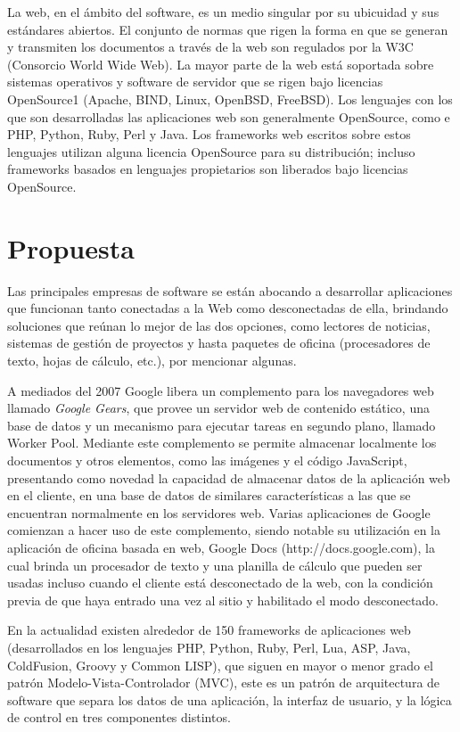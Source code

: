 \documentclass[a4paper]{report}
\begin{document}
    
La web, en el ámbito del software, es un medio singular por su ubicuidad y 
sus estándares abiertos. El conjunto de normas que rigen la forma en 
que se generan y transmiten los documentos a través de la web son 
regulados por la W3C (Consorcio World Wide Web). La mayor parte de la web está 
soportada sobre sistemas operativos y software de servidor que se rigen bajo 
licencias OpenSource1 (Apache, BIND, Linux, OpenBSD, FreeBSD). Los lenguajes 
con los que son desarrolladas las aplicaciones web son generalmente OpenSource, 
como e PHP, Python, Ruby, Perl y Java. Los frameworks web escritos sobre estos 
lenguajes utilizan alguna licencia OpenSource para su distribución; incluso 
frameworks basados en lenguajes propietarios son liberados bajo licencias OpenSource.


\chapter{Propuesta}
\label{ch:propuesta}
Las principales empresas de software se están abocando a desarrollar aplicaciones 
que funcionan tanto conectadas a la Web como desconectadas de ella, brindando 
soluciones que reúnan lo mejor de las dos opciones, como lectores de noticias, 
sistemas de gestión de proyectos y hasta paquetes de oficina (procesadores de 
texto, hojas de cálculo, etc.), por mencionar algunas.

A mediados del 2007 Google libera un complemento para los navegadores web 
llamado \emph{Google Gears}, que provee un servidor web de contenido estático, 
una base de datos y un mecanismo para ejecutar tareas en segundo plano, 
llamado Worker Pool. Mediante este complemento se permite almacenar localmente
los documentos y otros elementos, como las imágenes y el código JavaScript, 
presentando como novedad la capacidad de almacenar datos de la aplicación web 
en el cliente, en una base de datos de similares características a las que se
encuentran normalmente en los servidores web. Varias aplicaciones de Google 
comienzan a hacer uso de este complemento, siendo notable su utilización en 
la aplicación de oficina basada en web, Google Docs (http://docs.google.com), 
la cual brinda un procesador de texto y una planilla de cálculo que pueden ser 
usadas incluso cuando el cliente está desconectado de la web, con la condición 
previa de que haya entrado una vez al sitio y habilitado el modo desconectado.

En la actualidad existen alrededor de 150 frameworks de aplicaciones web 
(desarrollados en los lenguajes PHP, Python, Ruby, Perl, Lua, ASP, Java, 
ColdFusion, Groovy y Common LISP), que siguen en mayor o menor grado el
patrón Modelo-Vista-Controlador (MVC), este es un patrón de arquitectura de
software que separa los datos de una aplicación, la interfaz de usuario, 
y la lógica de control en tres componentes distintos. 
\end{document}
